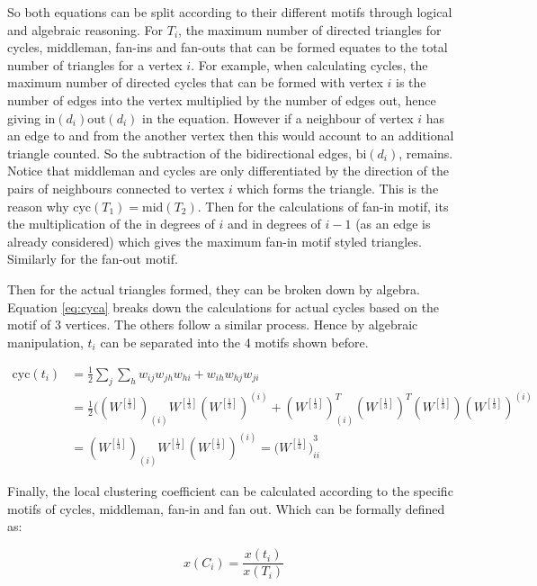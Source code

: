 So both equations can be split according to their different motifs through logical and algebraic reasoning. For $T_i$, the maximum number of directed triangles for cycles, middleman, fan-ins and fan-outs that can be formed equates to the total number of triangles for a vertex $i$. For example, when calculating cycles, the maximum number of directed cycles that can be formed with vertex $i$ is the number of edges into the vertex multiplied by the number of edges out, hence giving $\text{in}(d_i)\text{out}(d_i)$ in the equation. However if a neighbour of vertex $i$ has an edge to and from the another vertex then this would account to an additional triangle counted. So the subtraction of the bidirectional edges,  $\text{bi}(d_i)$, remains. Notice that middleman and cycles are only differentiated by the direction of the pairs of neighbours connected to vertex $i$ which forms the triangle. This is the reason why $\text{cyc}(T_1) = \text{mid}(T_2)$. Then for the calculations of fan-in motif, its the multiplication of the in degrees of $i$ and in degrees of $i - 1$ (as an edge is already considered) which gives the maximum fan-in motif styled triangles. Similarly for the fan-out motif.

Then for the actual triangles formed, they can be broken down by algebra. Equation \ref{eq:cyca} breaks down the calculations for actual cycles based on the motif of 3 vertices. The others follow a similar process. Hence by algebraic manipulation, $t_i$ can be separated into the 4 motifs shown before.

\begin{align} \label{eq:cyca}
\text{cyc}(t_i) &= \frac{1}{2}\sum_j\sum_h{w_{ij}w_{jh}w_{hi} + w_{ih}w_{hj}w_{ji}} \\
&= \frac{1}{2}((W^{[\frac{1}{3}]})_{(i)}W^{[\frac{1}{3}]}(W^{[\frac{1}{3}]})^{(i)} + (W^{[\frac{1}{3}]})_{(i)}^T(W^{[\frac{1}{3}]})^T(W^{[\frac{1}{3}]})(W^{[\frac{1}{3}]})^{(i)}  \nonumber \\
&= (W^{[\frac{1}{3}]})_{(i)}W^{[\frac{1}{3}]}(W^{[\frac{1}{3}]})^{(i)} = ({W^{[\frac{1}{3}]})}^3_{ii} \nonumber
\end{align}

Finally, the local clustering coefficient can be calculated according to the specific motifs of cycles, middleman, fan-in and fan out. Which can be formally defined as:

\begin{equation} \label{eq:wdmcc}
x(C_i) = \frac{x(t_i)}{x(T_i)}
\end{equation}

